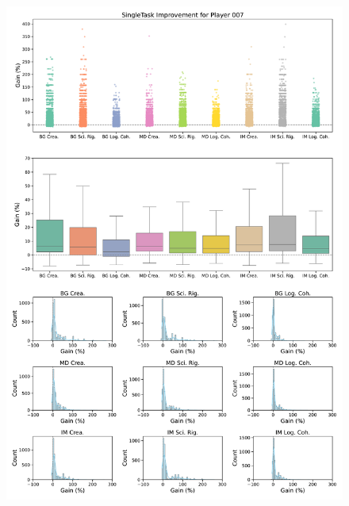 \begin{figure}[ht]
  \centering
  \includegraphics[width=\textwidth]{figures/gain_validity/singletask/singletask_gain_player_00007.pdf}
\end{figure}
\clearpage

